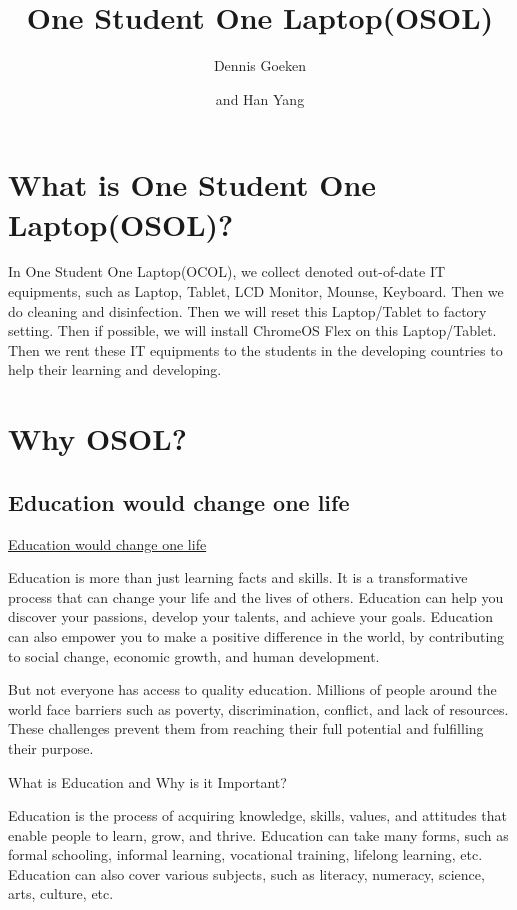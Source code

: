 \documentclass[a4paper,11pt]{article}
\title{One Student One Laptop(OSOL)}
\author{Dennis Goeken}
\author{and Han Yang}
\affiliation{IKAROS Shared Team, Riverty Group GmbH}
\begin{document}
\maketitle
\flushbottom

\section{What is One Student One Laptop(OSOL)?}
In One Student One Laptop(OCOL), we collect denoted out-of-date IT equipments, such as Laptop, Tablet, LCD Monitor, Mounse, Keyboard. Then we do cleaning and disinfection. Then we will reset this Laptop/Tablet to factory setting. Then if possible, we will install ChromeOS Flex on this Laptop/Tablet. Then we rent these IT equipments to the students in the developing countries to help their learning and developing. 


\section{Why OSOL?}

\subsection{Education would change one life}
\href{https://www.unesco.org/en/education}{Education would change one life}

Education is more than just learning facts and skills. It is a transformative process that can change your life and the lives of others. Education can help you discover your passions, develop your talents, and achieve your goals. Education can also empower you to make a positive difference in the world, by contributing to social change, economic growth, and human development.

But not everyone has access to quality education. Millions of people around the world face barriers such as poverty, discrimination, conflict, and lack of resources. These challenges prevent them from reaching their full potential and fulfilling their purpose.\cite{education-change-life-world}

What is Education and Why is it Important?

Education is the process of acquiring knowledge, skills, values, and attitudes that enable people to learn, grow, and thrive. Education can take many forms, such as formal schooling, informal learning, vocational training, lifelong learning, etc. Education can also cover various subjects, such as literacy, numeracy, science, arts, culture, etc.
\end{document}
